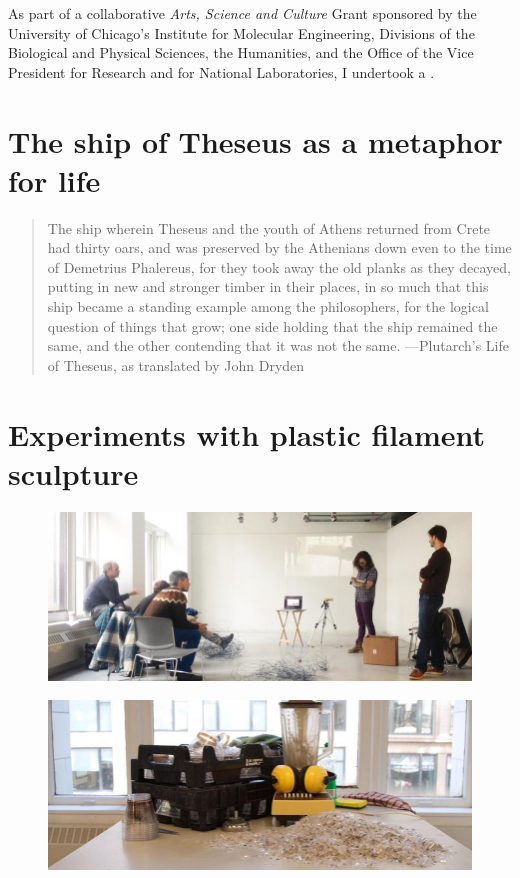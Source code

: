 As part of a collaborative \textit{Arts, Science and Culture} Grant sponsored by the University of Chicago's Institute for Molecular Engineering, Divisions of the Biological and Physical Sciences, the Humanities, and the Office of the Vice President for Research and for National Laboratories, I undertook a .

\section{The ship of Theseus as a metaphor for life}



{
\blockquote{ The ship wherein Theseus and the youth of Athens returned from Crete had thirty oars, and was preserved by the Athenians down even to the time of Demetrius Phalereus, for they took away the old planks as they decayed, putting in new and stronger timber in their places, in so much that this ship became a standing example among the philosophers, for the logical question of things that grow; one side holding that the ship remained the same, and the other contending that it was not the same. ---Plutarch's Life of Theseus, as translated by John Dryden }
}

\section{Experiments with plastic filament sculpture}

\begin{figure}[h!]
\centering
\includegraphics[width=\hsize]{art/collab1.jpg}
\caption{\label{fig:art_2}  }
\end{figure}

\begin{figure}[h!]
\centering
\includegraphics[width=\hsize]{art/shavings.jpg}
\caption{\label{fig:art_1}  }
\end{figure}

